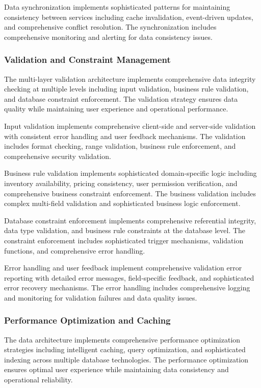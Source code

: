 Data synchronization implements sophisticated patterns for maintaining consistency between services including cache invalidation, event-driven updates, and comprehensive conflict resolution. The synchronization includes comprehensive monitoring and alerting for data consistency issues.

\subsubsection{Validation and Constraint Management}

The multi-layer validation architecture implements comprehensive data integrity checking at multiple levels including input validation, business rule validation, and database constraint enforcement. The validation strategy ensures data quality while maintaining user experience and operational performance.

Input validation implements comprehensive client-side and server-side validation with consistent error handling and user feedback mechanisms. The validation includes format checking, range validation, business rule enforcement, and comprehensive security validation.

Business rule validation implements sophisticated domain-specific logic including inventory availability, pricing consistency, user permission verification, and comprehensive business constraint enforcement. The business validation includes complex multi-field validation and sophisticated business logic enforcement.

Database constraint enforcement implements comprehensive referential integrity, data type validation, and business rule constraints at the database level. The constraint enforcement includes sophisticated trigger mechanisms, validation functions, and comprehensive error handling.

Error handling and user feedback implement comprehensive validation error reporting with detailed error messages, field-specific feedback, and sophisticated error recovery mechanisms. The error handling includes comprehensive logging and monitoring for validation failures and data quality issues.

\subsubsection{Performance Optimization and Caching}

The data architecture implements comprehensive performance optimization strategies including intelligent caching, query optimization, and sophisticated indexing across multiple database technologies. The performance optimization ensures optimal user experience while maintaining data consistency and operational reliability.

